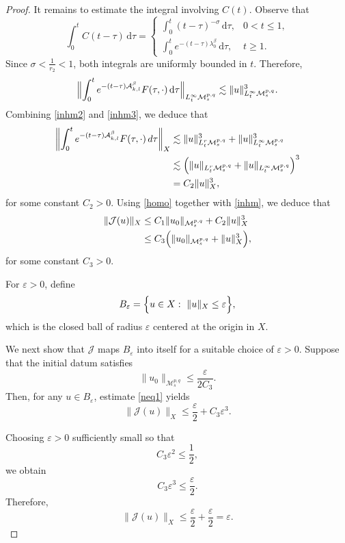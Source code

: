 \documentclass[12pt,reqno,a4paper]{amsart}
\numberwithin{equation}{section}
\theoremstyle{plain}
\theoremstyle{definition}
\theoremstyle{remark}
\def\M{\mathcal{M}}
\def \Ad{\mathcal{A}_{k,l}}
\def \M{{\mathcal M}}
\begin{document}
\begin{proof}
It remains to estimate the integral involving $C(t)$. Observe that
\[
\int_{0}^{t}C(t-\tau)\,\mathrm{d}\tau
=
\begin{cases}
\displaystyle
\int_{0}^{t}(t-\tau)^{-\sigma}\,\mathrm{d}\tau,
& 0<t\leq 1,
\\[1em]
\displaystyle
\int_{0}^{t}
e^{-(t-\tau)\lambda_{0}^{\beta}}
\,\mathrm{d}\tau,
& t\geq 1.
\end{cases}
\]
Since $\sigma<\frac{1}{r_{2}}<1$, both integrals are uniformly bounded in $t$. 
Therefore,
\begin{align}
\label{inhm3}
\Bigl\|
\int_{0}^{t}
e^{-(t-\tau)\Ad^{\beta}}
F(\tau,\cdot)\,\mathrm{d}\tau
\Bigr\|_{L^{\infty}_{t}\M^{p,q}_{s}}
\lesssim
\|u\|_{L^{\infty}_{t}\M^{p,q}_{s}}^{3}.
\end{align}
Combining \eqref{inhm2} and \eqref{inhm3}, we deduce that
\begin{align}
\label{inhm}
\left\|
\int_{0}^{t}
e^{-(t-\tau)\Ad^{\beta}}
F(\tau,\cdot)\,d\tau
\right\|_{X}
&\lesssim
\|u\|_{L^{r}_{t}\M^{p,q}_{s}}^{3}
+
\|u\|_{L^{\infty}_{t}\M^{p,q}_{s}}^{3}
\nonumber\\
&\lesssim
\Bigl(
\|u\|_{L^{r}_{t}\M^{p,q}_{s}}
+
\|u\|_{L^{\infty}_{t}\M^{p,q}_{s}}
\Bigr)^{3}
\nonumber\\
&=
C_{2}\|u\|_{X}^{3},
\end{align}
for some constant \(C_{2}>0\).
Using \eqref{homo} together with \eqref{inhm}, we deduce that
\begin{align}
\label{neq1}
\|\mathcal{J}(u)\|_{X}
&\leq
C_{1}\|u_{0}\|_{\M^{p,q}_{s}}
+
C_{2}\|u\|_{X}^{3}
\nonumber\\
&\leq
C_{3}
\Bigl(
\|u_{0}\|_{\M^{p,q}_{s}}
+
\|u\|_{X}^{3}
\Bigr),
\end{align}
for some constant $C_{3}>0$.

For $\varepsilon>0$, define
\[
B_{\varepsilon}
=
\Bigl\{
u\in X
:\ 
\|u\|_{X}\leq \varepsilon
\Bigr\},
\]
which is the closed ball of radius $\varepsilon$ centered at the origin in $X$.

We next show that \(\mathcal{J}\) maps \(B_{\varepsilon}\) into itself for a suitable choice of \(\varepsilon>0\). Suppose that the initial datum satisfies
\[
\|u_{0}\|_{\M^{p,q}_{s}}
\leq
\frac{\varepsilon}{2C_{3}}.
\]
Then, for any \(u\in B_{\varepsilon}\), estimate \eqref{neq1} yields
\[
\|\mathcal{J}(u)\|_{X}
\leq
\frac{\varepsilon}{2}
+
C_{3}\varepsilon^{3}.
\]

Choosing \(\varepsilon>0\) sufficiently small so that
\[
C_{3}\varepsilon^{2}\leq \frac12,
\]
we obtain
\[
C_{3}\varepsilon^{3}
\leq
\frac{\varepsilon}{2}.
\]
Therefore,
\[
\|\mathcal{J}(u)\|_{X}
\leq
\frac{\varepsilon}{2}
+
\frac{\varepsilon}{2}
=
\varepsilon.
\]


\end{proof}
\end{document}
